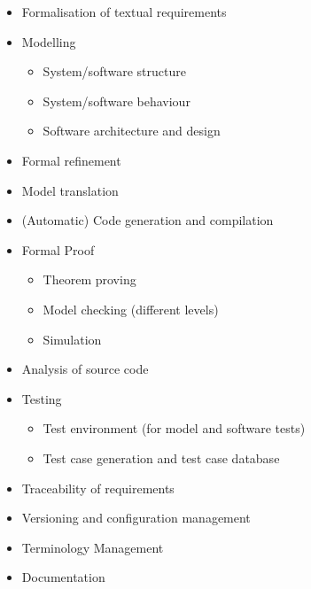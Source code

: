 \documentclass{./template/openetcs2}
\begin{document}
\vspace{-10pt}
\begin{itemize}[topsep=2pt, partopsep=2pt,itemsep=2pt,parsep=2pt]
\item Formalisation of textual requirements
\item Modelling

	\begin{itemize}
	\item System/software structure
	\item System/software behaviour
	\item Software architecture and design
	\end{itemize}

\item Formal refinement
\item Model translation
\item (Automatic) Code generation and compilation
\item Formal Proof

	\begin{itemize}
	\item Theorem proving
	\item Model checking (different levels)
	\item Simulation
	\end{itemize}

\item Analysis of source code
\item Testing

	\begin{itemize}
	\item Test environment (for model and software tests)
	\item Test case generation and test case database
	\end{itemize}


\item Traceability of requirements
\item Versioning and configuration management
\item Terminology Management
\item Documentation
\end{itemize}
\end{document}
